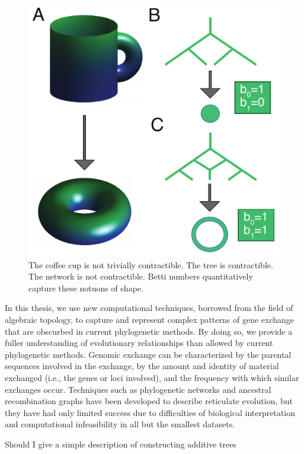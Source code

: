 \begin{figure}
\includegraphics[width=\columnwidth]{./fig/introduction/topology_example.pdf}
\caption[The Paradigmatic Topology Example]{The coffee cup is not trivially contractible. The tree is contractible. The network is not contractible. Betti numbers quantitatively capture these notuons of shape.}
\label{fig:topology_example}
\end{figure}

In this thesis, we use new computational techniques, borrowed from the field of algebraic topology, to capture and represent complex patterns of gene exchange that are obscurbed in current phylogenetic methods.
By doing so, we provide a fuller understanding of evolutionary relationships than allowed by current phylogenetic methods.
Genomic exchange can be characterized by the parental sequences involved in the exchange, by the amount and identity of material exchanged (i.e., the genes or loci involved), and the frequency with which similar exchanges occur.
Techniques such as phylogenetic networks and ancestral recombination graphs have been developed to describe reticulate evolution, but they have had only limited success due to difficulties of biological interpretation and computational infeasibility in all but the smallest datasets.

Should I give a simple description of constructing additive trees

